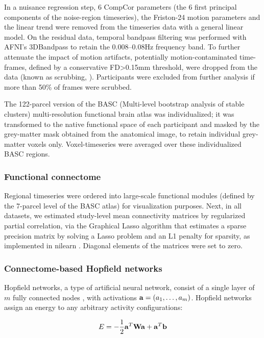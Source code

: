 \documentclass{article}
\begin{document}
In a nuisance regression step, 6 CompCor parameters (the 6 first principal components of the noise-region timeseries), the Friston-24 motion parameters and the linear trend were removed from the timeseries data with a general linear model. On the residual data, temporal bandpass filtering was performed with AFNI's 3DBandpass to retain the 0.008--0.08Hz frequency band. To further attenuate the impact of motion artifacts, potentially motion-contaminated time-frames, defined by a conservative FD\textgreater 0.15mm threshold, were dropped from the data (known as scrubbing, \cite{satterthwaite2013improved}). Participants were excluded from further analysis if more than 50\% of frames were scrubbed.

The 122-parcel version of the BASC (Multi-level bootstrap analysis of stable clusters) multi-resolution functional brain atlas \citep{bellec2010multi} was individualized; it was transformed to the native functional space of each participant and masked by the  grey-matter mask obtained from the anatomical image, to retain individual grey-matter voxels only. Voxel-timeseries were averaged over these individualized BASC regions.

\subsubsection{Functional connectome}

Regional timeseries were ordered into large-scale functional modules (defined by the 7-parcel level of the BASC atlas) for visualization purposes.
Next, in all datasets, we estimated study-level mean connectivity matrices by regularized partial correlation, via the Graphical Lasso algorithm that estimates a sparse precision matrix by solving a Lasso problem and an L1 penalty for sparsity, as implemented in nilearn \citep{abraham2014machine}. Diagonal elements of the matrices were set to zero.

\subsubsection{Connectome-based Hopfield networks}

Hopfield networks, a type of artificial neural network, consist of a single layer of $m$ fully connected nodes \citep{hopfield1982neural}, with activations $\bold{a} = (a_1, \dots, a_m )$. Hopfield networks assign an energy to any arbitrary activity configurations:

\begin{equation}
\label{energy-function}
E = - \frac{1}{2}  \bold{a}^{T} \bold{W} \bold{a} + \bold{a}^{T}\bold{b}
\end{equation}
\end{document}
